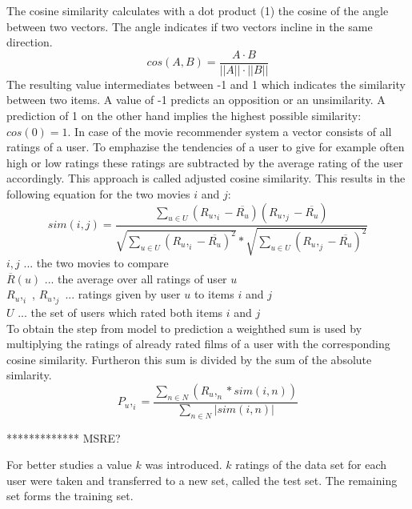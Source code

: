\documentclass[a4paper,12pt,twoside]{article}
\begin{document}
The cosine similarity calculates with a dot product (1) the cosine of the angle between two vectors.
The angle indicates if two vectors incline in the same direction.
\begin{equation}
cos(A, B) = \frac { A \cdot  B}{|| A|| \cdot || B||}
\end{equation}
The resulting value intermediates between -1 and 1 which indicates the similarity between two items. A value of -1 predicts an opposition or an unsimilarity. A prediction of 1 on the other hand implies the highest possible similarity: $cos(0) = 1$. 
In case of the movie recommender system a vector consists of all ratings of a user. To emphazise the tendencies of a user to give for example often high or low ratings these ratings are subtracted by the average rating of the user accordingly. This approach is called adjusted cosine similarity.  
This results in the following equation for the two movies $i$ and $j$:
\begin{equation}
sim (i,j) = 
\frac{
	\displaystyle\sum_{u \in U} (R_u,_i - \overline{R_u})(R_u,_j - \overline{R_u})
}
{
	\sqrt{ \displaystyle\sum_{u \in U} (R_u,_i - \overline{R_u})^2} 
	* \sqrt{\displaystyle\sum_{u \in U} (R_u,_j - \overline{R_u})^2}
}
\end{equation}
$ i,j$ ... the two movies to compare \\
$\overline{R}(u)$ ... the average over all ratings of user $u$ \\
$R_u,_i$ , $R_u,_j$  ... ratings given by user $u$ to items $i$ and $j$\\
$U$ ... the set of users which rated both items $i$ and $j$\\
To obtain the step from model to prediction a weighthed sum is used by multiplying the ratings of already rated films of a user with the corresponding cosine similarity. Furtheron this sum is divided by the sum of the absolute simlarity. \cite{sarwar}
\begin{equation}
P_u,_i = \frac{
\displaystyle\sum_{n \in N}(R_u,_n*sim(i,n))
}{
\displaystyle\sum_{n \in N}|sim(i,n)|
}
\end{equation}

************* MSRE?

For better studies a value $k$ was introduced. $k$ ratings of the data set for each user were taken and transferred to a new set, called the test set. The remaining set forms the training set.
\end{document}
